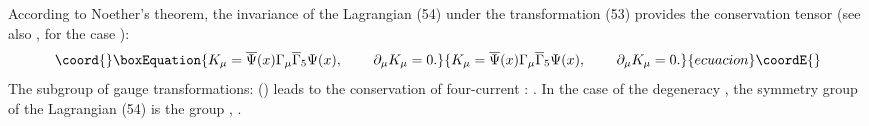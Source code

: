 \documentclass[a4paper,12pt]{article}
\begin{document}
According to Noether's theorem, the invariance of the Lagrangian
(54) under the transformation (53) provides the conservation
tensor (see also \cite{Kruglov1}, \cite{monogr} for the case
\coordHE{}):
\begin{equation}\coord{}\boxEquation{
 K_\mu = \overline{\Psi }(x)\Gamma _\mu
\overline{\Gamma }_5\Psi (x) ,\hspace{0.3in}\partial_\mu K_\mu =0
. \label{55}
}{
 K_\mu = \overline{\Psi }(x)\Gamma _\mu
\overline{\Gamma }_5\Psi (x) ,\hspace{0.3in}\partial_\mu K_\mu =0
. }{ecuacion}\coordE{}\end{equation}
The subgroup \coordHE{} of gauge transformations: \coordHE{} (\myHighlight{$\alpha ^{*}=\alpha $}\coordHE{})
leads to the conservation of four-current \coordHE{}: \coordHE{}. In the case of
the degeneracy \coordHE{}, the symmetry group of the Lagrangian (54)
is the \coordHE{} group \cite{Kruglov1}, \cite{monogr}.
\end{document}
